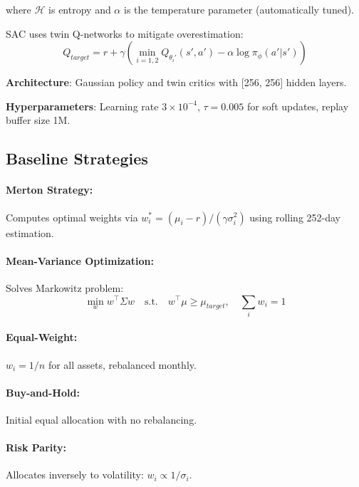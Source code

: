 \documentclass[12pt]{article}
\begin{document}
where $\mathcal{H}$ is entropy and $\alpha$ is the temperature parameter (automatically tuned).

SAC uses twin Q-networks to mitigate overestimation:
\begin{equation}
    Q_{target} = r + \gamma \left( \min_{i=1,2} Q_{\theta_i'}(s', a') - \alpha \log \pi_\phi(a'|s') \right)
\end{equation}

\textbf{Architecture}: Gaussian policy and twin critics with [256, 256] hidden layers.

\textbf{Hyperparameters}: Learning rate $3 \times 10^{-4}$, $\tau = 0.005$ for soft updates, replay buffer size 1M.

\subsection{Baseline Strategies}

\paragraph{Merton Strategy:}
Computes optimal weights via $w_i^* = (\mu_i - r) / (\gamma \sigma_i^2)$ using rolling 252-day estimation.

\paragraph{Mean-Variance Optimization:}
Solves Markowitz problem:
\begin{equation}
    \min_w w^\top \Sigma w \quad \text{s.t.} \quad w^\top \mu \geq \mu_{target}, \quad \sum_i w_i = 1
\end{equation}

\paragraph{Equal-Weight:}
$w_i = 1/n$ for all assets, rebalanced monthly.

\paragraph{Buy-and-Hold:}
Initial equal allocation with no rebalancing.

\paragraph{Risk Parity:}
Allocates inversely to volatility: $w_i \propto 1/\sigma_i$.
\end{document}
